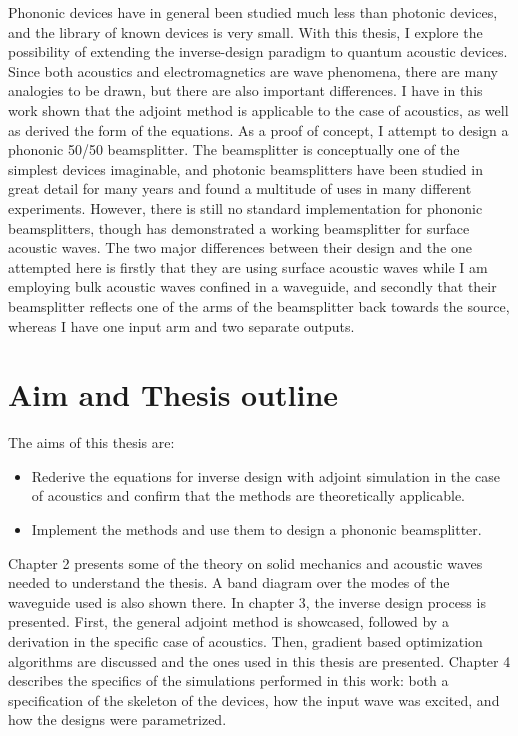 Phononic devices have in general been studied much less than photonic
devices, and the library of known devices is very small.
With this thesis, I explore the possibility of extending the inverse-design paradigm to
quantum acoustic devices.
Since both acoustics and electromagnetics are wave phenomena, there are many
analogies to be drawn, but there are also important differences.
I have in this work shown that the adjoint method is applicable to the case of
acoustics, as well as derived the form of the equations.
As a proof of concept, I attempt to design a phononic 50/50 beamsplitter.
The beamsplitter is conceptually one of the simplest devices imaginable,
and photonic beamsplitters have been studied in great detail for many years
and found a multitude of uses in many different experiments.
However, there is still no standard implementation for phononic beamsplitters,
though \cite{qiao2023developing} has demonstrated a working beamsplitter for
surface acoustic waves.
The two major differences between their design and the one attempted here is
firstly that they are using surface acoustic waves while I am employing bulk
acoustic waves confined in a waveguide, and secondly that their beamsplitter
reflects one of the arms of the beamsplitter back towards the source, whereas I
have one input arm and two separate outputs.

\section{Aim and Thesis outline}

The aims of this thesis are:
\begin{itemize}
	\item Rederive the equations for inverse design with adjoint simulation in
		the case of acoustics and confirm that the methods are theoretically
		applicable.
	\item Implement the methods and use them to design a phononic beamsplitter.
\end{itemize}

Chapter 2 presents some of the theory on solid mechanics and acoustic waves needed to
understand the thesis.
A band diagram over the modes of the waveguide used is also shown there.
In chapter 3, the inverse design process is presented. First, the general
adjoint method is showcased, followed by a derivation in the specific case of
acoustics.
Then, gradient based optimization algorithms are discussed and the ones used in
this thesis are presented.
Chapter 4 describes the specifics of the simulations performed in this work:
both a specification of the skeleton of the devices, how the input wave was excited,
and how the designs were parametrized.
